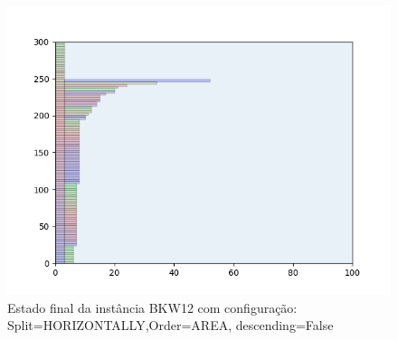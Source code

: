 \begin{figure}[H]
    \centering
    \caption[]{Estado final da instância BKW12 com configuração: Split=HORIZONTALLY,Order=AREA, descending=False}
    \label{fig:bkw12-horizontally-area-false}
    \includegraphics[scale=0.5]{output/figures/bkw/bkw12/horizontally/area/false/000}
\end{figure}